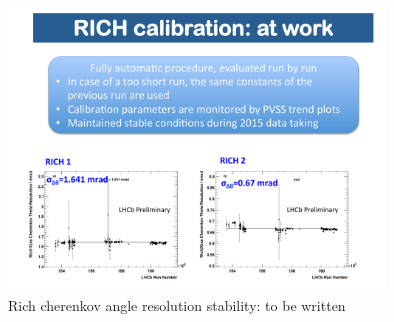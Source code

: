\begin{figure}[h]
  \centering
  \includegraphics[width=10cm]{../figures/RichStability}
  \caption{Rich cherenkov angle resolution stability: to be written
}
  \label{fig:RichStability}
\end{figure}


